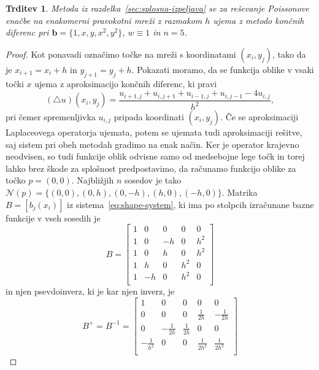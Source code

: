 \documentclass[12pt,a4paper,twoside]{article}
\theoremstyle{definition} %
\theoremstyle{plain} %
\newtheorem{trditev}[definicija]{Trditev}
\numberwithin{equation}{section}
\newcommand{\Nc}{\mathcal{N}}
\newcommand{\lap}{\triangle}
\renewcommand{\b}{\boldsymbol}
\begin{document}
\begin{trditev}
  \label{trd:eq-to-fdm}
  Metoda iz razdelka~\ref{sec:splosna-izpeljava} se za reševanje Poissonove
  enačbe na enakomerni pravokotni mreži z razmakom $h$ ujema z metodo končnih
  diferenc pri $\b{b} = \{1, x, y, x^2, y^2\}$, $w \equiv 1$ in
  $n=5$.
\end{trditev}
\begin{proof}
Kot ponavadi označimo točke na mreži s koordinatami $(x_i, y_j)$, tako da je
$x_{i+1} = x_i + h$ in $y_{j+1} = y_j + h$.
Pokazati moramo, da se funkcija oblike v vsaki točki $x$ ujema z aproksimacijo končnih diferenc, ki
pravi
\begin{equation}
  (\lap u)(x_i, y_j) = \frac{u_{i+1,j} + u_{i, j+1} + u_{i-1,j} + u_{i, j-1} - 4u_{i,j}}{h^2},
\end{equation}
pri čemer spremenljivka $u_{i, j}$ pripada koordinati $(x_i, y_j)$. Če se
aproksimaciji Laplaceovega operatorja ujemata, potem se ujemata tudi
aproksimaciji rešitve, saj sistem pri obeh metodah gradimo na enak način.
Ker je operator krajevno neodvisen, so tudi funkcije oblik odvisne samo od
medsebojne lege točk in torej lahko brez škode
za splošnost predpostavimo, da računamo funkcijo oblike za točko
$p = (0, 0)$. Najbližjih $n$ sosedov je tako $\Nc(p) = \{(0, 0), (0, h), (0, -h),
(h, 0), (-h, 0)\}$. Matrika $B = [b_j(x_i)]$ iz sistema~\eqref{eq:shape-system},
ki ima po stolpcih izračunane bazne funkcije v vseh sosedih je
\begin{equation}
  \label{eq:fdm-special-case-start}
  B =
  \begin{bmatrix}
    1 & 0 & 0 & 0 & 0 \\
    1 & 0 & -h & 0 & h^2 \\
    1 & 0 & h & 0 & h^2 \\
    1 & h & 0 & h^2 & 0 \\
    1 & -h & 0 & h^2 & 0 \\
  \end{bmatrix}
\end{equation}
in njen psevdoinverz, ki je kar njen inverz, je
\begin{equation}
  B^+ = B^{-1} =
  \begin{bmatrix}
     1 & 0 & 0 & 0 & 0 \\
 0 & 0 & 0 & \frac{1}{2 h} & -\frac{1}{2 h} \\
 0 & -\frac{1}{2 h} & \frac{1}{2 h} & 0 & 0 \\
 -\frac{1}{h^2} & 0 & 0 & \frac{1}{2 h^2} & \frac{1}{2 h^2} \\

\end{bmatrix}
\end{equation}
\end{proof}
\end{document}
